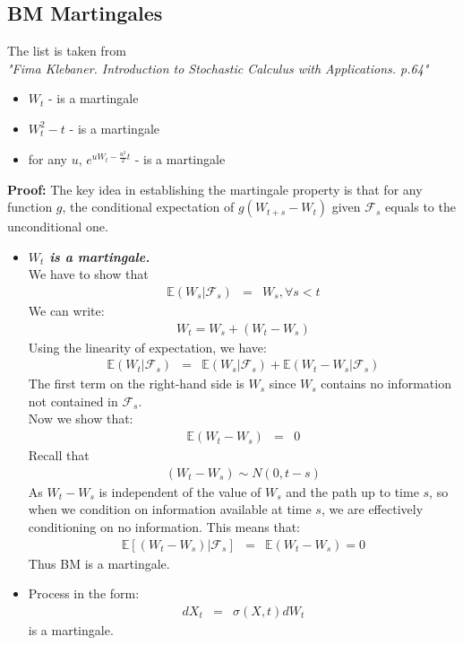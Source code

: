 \subsection{BM Martingales}
The list is taken from\\
\textit{"Fima Klebaner. Introduction to Stochastic Calculus with Applications. p.64"}
\begin{itemize}
	\item \textbf{\color{blue}$W_{t}$} - is a martingale
	\item \textbf{\color{blue}$W_{t}^{2} - t$} - is a martingale
	\item for any $u$, \textbf{\color{blue}$e^{uW_{t} - \frac{u^{2}}{2}t}$} - is a martingale
\end{itemize}
\textbf{Proof:} The key idea in establishing the martingale property is that for any function $g$, the conditional expectation of $g(W_{t + s} - W_{t})$ given $\mathscr{F}_{s}$ equals to the unconditional one.

\begin{itemize}
	\item \textbf{\textit{$W_{t}$ is a martingale.}}\\
	We have to show that
	\begin{eqnarray}
	\mathbb{E}(W_{s}\vert\mathscr{F}_{s}) &=& W_{s}, \forall s < t
	\end{eqnarray}
	We can write:
	\begin{eqnarray}
	W_{t} = W_{s} + (W_{t} - W_{s})
	\end{eqnarray}
	Using the linearity of expectation, we have:
	\begin{eqnarray}
	\mathbb{E}(W_{t}\vert \mathscr{F}_{s}) &=& \mathbb{E}(W_{s}\vert \mathscr{F}_{s}) + \mathbb{E}(W_{t} - W_{s}\vert\mathscr{F}_{s})
	\end{eqnarray}
	The first term on the right-hand side is $W_{s}$ since $W_{s}$ contains no information not contained in $\mathscr{F}_{s}$.\\
	Now we show that:\\
	\begin{eqnarray}
	\mathbb{E}(W_{t} - W_{s}) &=& 0
	\end{eqnarray}
	Recall that
	\begin{eqnarray}
	(W_{t} - W_{s}) \sim N(0, t - s)
	\end{eqnarray}
	As $W_{t} - W_{s}$ is independent of the value of $W_{s}$ and the path up to time $s$, so when we condition on information available at time $s$, we are effectively conditioning on no information. This means that:
	\begin{eqnarray}
	\mathbb{E}[(W_{t} - W_{s})\vert \mathscr{F}_{s}]&=& \mathbb{E}(W_{t} - W_{s}) = 0
	\end{eqnarray}
	Thus BM is a martingale.
	\item Process in the form:
	\begin{eqnarray}
	dX_{t} &=& \sigma(X, t)dW_{t}
	\end{eqnarray}
	is a martingale.
\end{itemize}

